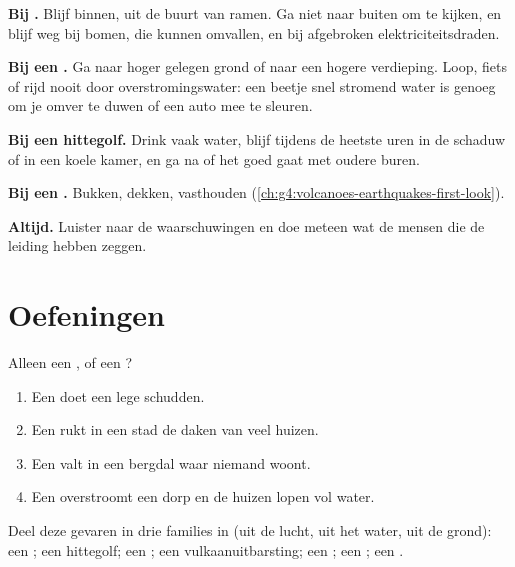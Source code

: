 \begin{safety}
\textbf{Bij .} Blijf binnen, uit de buurt van ramen. Ga niet naar
buiten om te kijken, en blijf weg bij bomen, die kunnen omvallen, en bij
afgebroken elektriciteitsdraden.

\textbf{Bij een .} Ga naar hoger gelegen grond of naar een
hogere verdieping. Loop, fiets of rijd nooit door overstromingswater: een
beetje snel stromend water is genoeg om je omver te duwen of een auto mee
te sleuren.

\textbf{Bij een hittegolf.} Drink vaak water, blijf tijdens de heetste uren
in de schaduw of in een koele kamer, en ga na of het goed gaat met oudere
buren.

\textbf{Bij een .} Bukken, dekken, vasthouden
(\cref{ch:g4:volcanoes-earthquakes-first-look}).

\textbf{Altijd.} Luister naar de waarschuwingen en doe meteen wat de mensen
die de leiding hebben zeggen.
\end{safety}

\section{Oefeningen}

\begin{exercise}[$\star$]\label{exo:g5:natural-hazards:1}
Alleen een , of een ?
\begin{enumerate}
  \item[(a)] Een  doet een lege  schudden.
  \item[(b)] Een  rukt in een stad de daken van veel huizen.
  \item[(c)] Een  valt in een bergdal waar niemand woont.
  \item[(d)] Een  overstroomt een dorp en de huizen lopen vol water.
\end{enumerate}
\end{exercise}

\begin{exercise}[$\star$]\label{exo:g5:natural-hazards:2}
Deel deze gevaren in drie families in (uit de lucht, uit het water, uit de
grond): een ; een hittegolf; een ; een
vulkaanuitbarsting; een ; een ; een .
\end{exercise}

